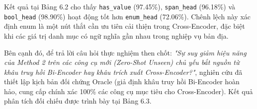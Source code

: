 \begin{table}[htbp]
    \centering
    \caption{Đánh giá chất lượng độc lập của các đầu phân cấp trong Cross-Encoder}
    \label{tab:bảng_6_2}
\end{table}

Kết quả tại Bảng 6.2 cho thấy \texttt{has_value} (97.45\%), \texttt{span_head} (96.18\%) và \texttt{bool_head} (98.90\%) hoạt động tốt hơn \texttt{enum_head} (72.06\%). Chênh lệch này xác định enum là một nút thắt cần ưu tiên cải thiện trong Cross-Encoder, đặc biệt khi các giá trị danh mục có ngữ nghĩa gần nhau trong nghiệp vụ bản địa.

Bên cạnh đó, để trả lời câu hỏi thực nghiệm then chốt: \textit{"Sự suy giảm hiệu năng của Method 2 trên các công cụ mới (Zero-Shot Unseen) chủ yếu bắt nguồn từ khâu truy hồi Bi-Encoder hay khâu trích xuất Cross-Encoder?"}, nghiên cứu đã thiết lập kịch bản đối chứng Oracle (giả định khâu truy hồi Bi-Encoder hoàn hảo, cung cấp chính xác 100\% các công cụ mục tiêu cho Cross-Encoder). Kết quả phân tích đối chiếu được trình bày tại Bảng 6.3.


